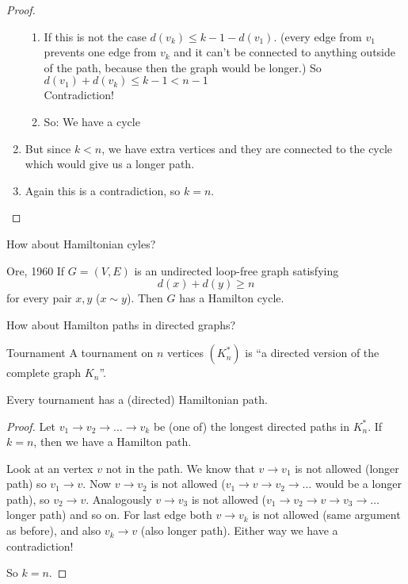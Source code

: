 \documentclass[english]{lbscript}
\begin{document}
\begin{proof}
\begin{enumerate}
\begin{enumerate}
      \item\label{item:39} If this is not the case \(d(v_k)≤ k-1 - d(v_1)\). (every edge from \(v_1\) prevents one edge from \(v_k\) and it can't be connected to anything outside of the path, because then the graph would be longer.) So \(d(v_1)+d(v_k)≤k-1<n-1\)\\
      Contradiction!
      \item\label{item:41} So: We have a cycle
    \end{enumerate}
    \item\label{item:40} But since \(k<n\), we have extra vertices and they are connected to the cycle which would give us a longer path.
    \item\label{item:42} Again this is a contradiction, so \(k=n\).
  \end{enumerate}
\end{proof}

How about Hamiltonian cyles?
\begin{theorem}{Ore, 1960}{}
  If \(G=(V,E)\) is an undirected loop-free graph satisfying
  \begin{equation}
    \label{eq:99}
    d(x)+d(y)≥n
  \end{equation}
  for every pair \(x,y\) (\(x\sim y\)). Then \(G\) has a Hamilton cycle.
\end{theorem}

How about Hamilton paths in directed graphs?
\begin{definition}{Tournament}{}
  A tournament on \(n\) vertices \((K_n^{*})\) is \enquote{a directed version of the complete graph \(K_n\)}.
\end{definition}

\begin{theorem}{}{}
  Every tournament has a (directed) Hamiltonian path.
\end{theorem}
\begin{proof}
  Let \(v_1→v_2→\dots→v_k\) be (one of) the longest directed paths in \(K_{n}^{*}\). If \(k=n\), then we have a Hamilton path.

  Look at an vertex \(v\) not in the path. We know that \(v→v_1\) is not allowed (longer path) so \(v_1→v\). Now \(v→v_2\) is not allowed (\(v_1→v→v_2→\dots\) would be a longer path), so \(v_2→v\). Analogously \(v→v_3\) is not allowed (\(v_1→v_2→v→v_3→\dots\) longer path) and so on. For last edge both \(v→v_k\) is not allowed (same argument as before), and also \(v_k→v\) (also longer path). Either way we have a contradiction!

  So \(k=n\).
\end{proof}
\end{document}
